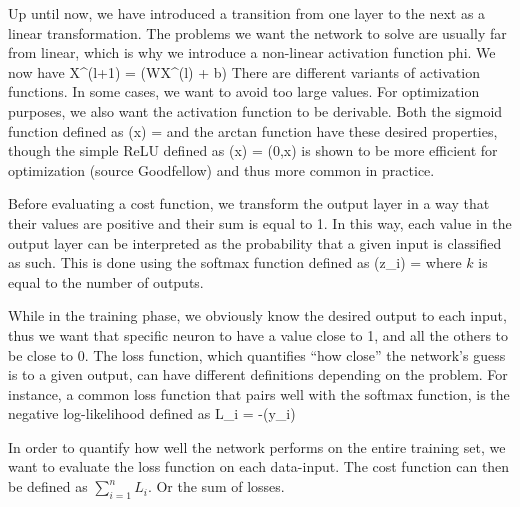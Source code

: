 \startsubsection[title=Activation function] 
Up until now, we have introduced a transition from one layer to the next as a linear transformation.
The problems we want the network to solve are usually far from linear, which is why we introduce a non-linear activation function phi. We now have
\startplaceformula
\startformula
X^{(l+1)} = \phi(WX^{(l)} + b)
\stopformula
\stopplaceformula
There are different variants of activation functions. In some cases, we want to avoid too large values.
For optimization purposes, we also want the activation function to be derivable.
Both the sigmoid function defined as 
\startplaceformula
\startformula
\phi(x) = 
\stopformula
\stopplaceformula
and the arctan function have these desired properties, though the simple ReLU defined as
\startformula
\phi(x) = \max(0,x) 
\stopformula
is shown to be more efficient for optimization (source Goodfellow) and thus more common in practice.

\startplacefigure[reference=activation,
                  location=bottom,
                  title={A visual}]
\stopplacefigure

\stopsubsection

\startsubsection[title=Softmax, loss and cost function ]
Before evaluating a cost function, we transform the output layer in a way that their values are positive and their sum is equal to 1. 
In this way, each value in the output layer can be interpreted as the probability that a given input is classified as such.
This is done using the softmax function defined as
\startplaceformula
\startformula
\sigma(z_i) =  
\stopformula
\stopplaceformula
where $k$ is equal to the number of outputs. 

While in the training phase, we obviously know the desired output to each input, thus we want that specific neuron to have a value close to 1, and all the others to be close to 0. 
The loss function, which quantifies “how close” the network’s guess is to a given output, can have different definitions depending on the problem.
For instance, a common loss function that pairs well with the softmax function, is the negative log-likelihood defined as
\startplaceformula
\startformula
L_i = -\log(y_i)
\stopformula
\stopplaceformula

In order to quantify how well the network performs on the entire training set, we want to evaluate the loss function on each data-input. 
The cost function can then be defined as $\sum_{i=1}^n L_i$. Or the sum of losses. 
\stopsubsection

